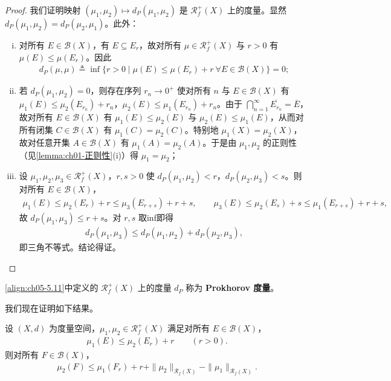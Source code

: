 \documentclass[../../main.tex]{subfiles}%
\begin{document}
\begin{proof}
我们证明映射 $(\mu_1,\mu_2)\mapsto d_P(\mu_1,\mu_2)$ 是 $\mathscr{R}^+_f(X)$ 上的度量。显然 $d_P(\mu_1,\mu_2)=d_P(\mu_2,\mu_1)$。此外：
\begin{enumerate}[(i)]
\item 对所有 $E\in\mathscr{B}(X)$，有 $E\subseteq E_r$，故对所有 $\mu\in\mathscr{R}^+_f(X)$ 与 $r>0$ 有 $\mu(E)\leqslant\mu(E_r)$。因此
\begin{align*}
d_P(\mu,\mu)\triangleq \inf\{r>0\mid\mu(E)\leqslant\mu(E_r)+r\ \forall E\in\mathscr{B}(X)\}=0;
\end{align*}
\item 若 $d_P(\mu_1,\mu_2)=0$，则存在序列 $r_n\to0^+$ 使对所有 $n$ 与 $E\in\mathscr{B}(X)$ 有 $\mu_1(E)\leqslant\mu_2(E_{r_n})+r_n$，$\mu_2(E)\leqslant\mu_1(E_{r_n})+r_n$。由于 $\bigcap_{n=1}^\infty\overline{E_{r_n}}=\overline{E}$，故对所有 $E\in\mathscr{B}(X)$ 有 $\mu_1(E)\leqslant\mu_2(E)$ 与 $\mu_2(E)\leqslant\mu_1(E)$，从而对所有闭集 $C\in\mathscr{B}(X)$ 有 $\mu_1(C)=\mu_2(C)$。特别地 $\mu_1(X)=\mu_2(X)$，故对任意开集 $A\in\mathscr{B}(X)$ 有 $\mu_1(A)=\mu_2(A)$。于是由 $\mu_1,\mu_2$ 的正则性（见\cref{lemma:ch01-正则性}(i)）得 $\mu_1=\mu_2$；
\item 设 $\mu_1,\mu_2,\mu_3\in\mathscr{R}^+_f(X)$，$r,s>0$ 使 $d_P(\mu_1,\mu_2)<r$，$d_P(\mu_2,\mu_3)<s$。则对所有 $E\in\mathscr{B}(X)$，
\begin{align*}
\mu_1(E)\leqslant\mu_2(E_r)+r\leqslant\mu_3(E_{r+s})+r+s,\qquad
\mu_3(E)\leqslant\mu_2(E_s)+s\leqslant\mu_1(E_{r+s})+r+s,
\end{align*}
故 $d_P(\mu_1,\mu_3)\leqslant r+s$。对 $r,s$ 取inf即得
\begin{align*}
d_P(\mu_1,\mu_3)\leqslant d_P(\mu_1,\mu_2)+d_P(\mu_2,\mu_3),
\end{align*}
即三角不等式。结论得证。
\end{enumerate}
\end{proof}

\begin{definition}\label{definition:ch05-Prokhorov}
\eqref{align:ch05-5.11}中定义的 $\mathscr{R}^+_f(X)$ 上的度量 $d_P$ 称为 \textbf{Prokhorov 度量}。
\end{definition}

我们现在证明如下结果。

\begin{lemma}\label{lemma:ch05-Prokhorov对称}
设 $(X,d)$ 为度量空间，$\mu_1,\mu_2\in\mathscr{R}^+_f(X)$ 满足对所有 $E\in\mathscr{B}(X)$，
\begin{align}
\mu_1(E)\leqslant\mu_2(E_r)+r\qquad(r>0).\label{align:ch05-5.12}
\end{align}
则对所有 $F\in\mathscr{B}(X)$，
\begin{align}
\mu_2(F)\leqslant\mu_1(F_r)+r+\|\mu_2\|_{\mathscr{R}_f(X)}-\|\mu_1\|_{\mathscr{R}_f(X)}.\label{align:ch05-5.13}
\end{align}
\end{lemma}
\end{document}
